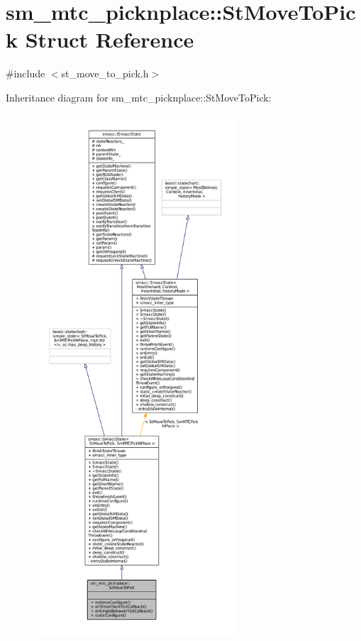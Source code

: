 \hypertarget{structsm__mtc__picknplace_1_1StMoveToPick}{}\section{sm\+\_\+mtc\+\_\+picknplace\+:\+:St\+Move\+To\+Pick Struct Reference}
\label{structsm__mtc__picknplace_1_1StMoveToPick}


{\ttfamily \#include $<$st\+\_\+move\+\_\+to\+\_\+pick.\+h$>$}



Inheritance diagram for sm\+\_\+mtc\+\_\+picknplace\+:\+:St\+Move\+To\+Pick\+:
\nopagebreak
\begin{figure}[H]
\begin{center}
\leavevmode
\includegraphics[height=550pt]{structsm__mtc__picknplace_1_1StMoveToPick__inherit__graph}
\end{center}
\end{figure}


